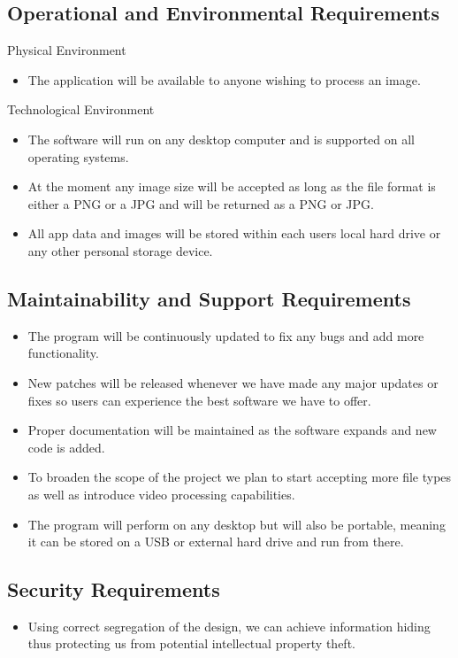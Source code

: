 \documentclass[12pt, titlepage]{article}
\begin{document}
\subsection{Operational and Environmental Requirements}
Physical Environment
\begin{itemize}
\item The application will be available to anyone wishing to process an image.
\end{itemize}
Technological Environment
\begin{itemize}
\item The software will run on any desktop computer and is supported on all operating systems.
\item At the moment any image size will be accepted as long as the file format is either a PNG or a JPG and will be returned as a PNG or JPG.
\item All app data and images will be stored within each users local hard drive or any other personal storage device.
\end{itemize}

\subsection{Maintainability and Support Requirements}
\begin{itemize}
\item The program will be continuously updated to fix any bugs and add more functionality.
\item New patches will be released whenever we have made any major updates or fixes so users can experience the best software we have to offer.
\item Proper documentation will be maintained as the software expands and new code is added.
\item To broaden the scope of the project we plan to start accepting more file types as well as introduce video processing capabilities.
\item The program will perform on any desktop but will also be portable, meaning it can be stored on a USB or external hard drive and run from there.
\end{itemize}

\subsection{Security Requirements}
\begin{itemize}
\item Using correct segregation of the design, we can achieve information hiding thus protecting us from potential intellectual property theft.
\end{itemize}
\end{document}
